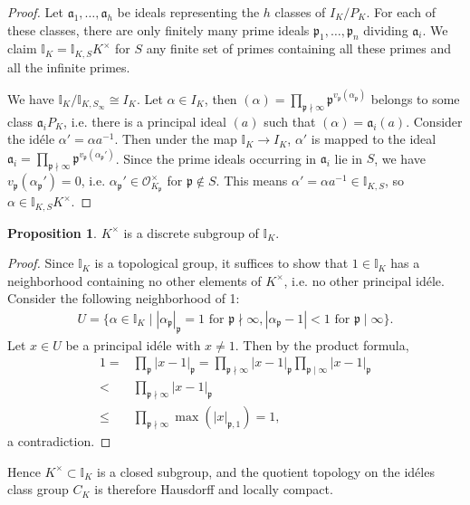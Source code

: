 \documentclass{article}
\theoremstyle{definition}
\newtheorem{prop}[theorem]{Proposition}
\begin{document}
\begin{proof}
    Let $\mathfrak{a}_1,\ldots,\mathfrak{a}_h$ be ideals representing the $h$ classes of $I_K/P_K$. For each of these classes, there are only finitely many prime ideals $\mathfrak{p}_1,\ldots,\mathfrak{p}_n$ dividing $\mathfrak{a}_i$. We claim $\mathbb{I}_K = \mathbb{I}_{K,S}K^\times$ for $S$ any finite set of primes containing all these primes and all the infinite primes.
    \vspace{1mm}
     
    We have $\mathbb{I}_K/\mathbb{I}_{K,S_{\infty}} \cong I_K$. Let $\alpha \in I_K$, then $(\alpha) = \prod_{\mathfrak{p}\nmid \infty}^{} \mathfrak{p}^{v_{\mathfrak{p}}(\alpha_{\mathfrak{p}})}$ belongs to some class $\mathfrak{a}_i P_K$, i.e. there is a principal ideal $(a)$ such that $(\alpha) = \mathfrak{a}_i (a)$. Consider the id\'ele $\alpha' = \alpha a^{-1}$. Then under the map $\mathbb{I}_K \to I_K$, $\alpha'$ is mapped to the ideal $\mathfrak{a}_i = \prod_{\mathfrak{p} \nmid \infty}^{} \mathfrak{p}^{v_{\mathfrak{p}}(\alpha_{\mathfrak{p}}')}$. Since the prime ideals occurring in $\mathfrak{a}_i$ lie in $S$, we have $v_{\mathfrak{p}}(\alpha_{\mathfrak{p}}') = 0$, i.e. $\alpha_{\mathfrak{p}}' \in \mathcal{O}_{K_{\mathfrak{p}}}^\times$ for $\mathfrak{p} \not\in S$. This means $\alpha' = \alpha a^{-1} \in \mathbb{I}_{K,S}$, so $\alpha \in \mathbb{I}_{K,S}K^\times$.
\end{proof}
\begin{prop}\label{prop4.10}
    $K^\times$ is a discrete subgroup of $\mathbb{I}_K$.
\end{prop}
\begin{proof}
    Since $\mathbb{I}_K$ is a topological group, it suffices to show that $1 \in \mathbb{I}_K$ has a neighborhood containing no other elements of $K^\times$, i.e. no other principal id\'ele. Consider the following neighborhood of 1:
    \begin{align*}
        U = \{\alpha \in \mathbb{I}_K \mid \left|\alpha_{\mathfrak{p}}\right|_{\mathfrak{p}}=1 \text{ for }\mathfrak{p}\nmid \infty, \left|\alpha_{\mathfrak{p}}-1\right|<1 \text{ for }\mathfrak{p} \mid \infty\}.
    \end{align*}
    Let $x \in U$ be a principal id\'ele with $x \neq 1$. Then by the product formula,
    \begin{align*}
        1 =& \prod_{\mathfrak{p}}^{} \left|x-1\right|_{\mathfrak{p}} = \prod_{\mathfrak{p}\nmid \infty}^{} \left|x-1\right|_{\mathfrak{p}} \prod_{\mathfrak{p} \mid \infty}^{} \left|x-1\right|_{\mathfrak{p}}\\
        <& \prod_{\mathfrak{p}\nmid \infty}^{} \left|x-1\right|_{\mathfrak{p}}\\
        \le & \prod_{\mathfrak{p}\nmid \infty}^{} \max(\left|x\right|_{\mathfrak{p},1}) = 1, 
    \end{align*}
    a contradiction.
\end{proof}
Hence $K^\times \subset \mathbb{I}_K$ is a closed subgroup, and the quotient topology on the id\'eles class group $C_K$ is therefore Hausdorff and locally compact.
\end{document}

